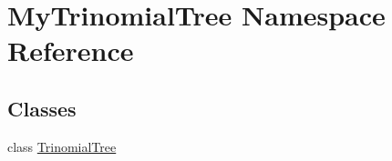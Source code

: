 \hypertarget{namespaceMyTrinomialTree}{}\section{My\+Trinomial\+Tree Namespace Reference}
\label{namespaceMyTrinomialTree}
\subsection*{Classes}
\begin{DoxyCompactItemize}
\item 
class \hyperlink{classMyTrinomialTree_1_1TrinomialTree}{Trinomial\+Tree}
\end{DoxyCompactItemize}
